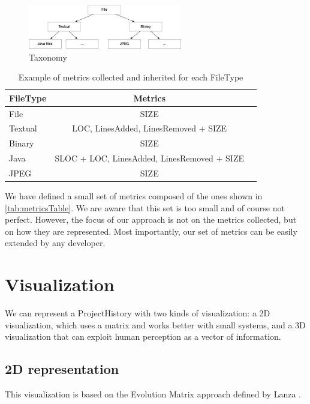 \begin{figure}
    \center
    \includegraphics[width=0.6\textwidth]{Taxonomy.jpg}
    \caption{Taxonomy}
    \label{fig:taxonomy}
\end{figure}

\begin{table}[ht]
    \centering
    \begin{tabular}{lcr} \hline
        {\bf FileType} & {\bf Metrics}\\ \hline
        File    & SIZE      \\
        Textual & LOC, LinesAdded, LinesRemoved + SIZE \\
        Binary  & SIZE         \\
        Java    & SLOC + LOC, LinesAdded, LinesRemoved + SIZE \\
        JPEG    & SIZE \\
    \end{tabular}
    \label{tab:metricsTable}
    \caption[]{Example of metrics collected and inherited for each FileType}
\end{table}

We have defined a small set of metrics composed of the ones shown in \autoref{tab:metricsTable}. We are aware that this set is too small and of course not perfect. However, the focus of our approach is not on the metrics collected, but on how they are represented. Most importantly, our set of metrics can be easily extended by any developer.


\section{Visualization}
We can represent a ProjectHistory with two kinds of visualization: a 2D visualization, which uses a matrix and works better with small systems, and a 3D visualization that can exploit human perception as a vector of information. 


\subsection{2D representation}
This visualization is based on the Evolution Matrix approach defined by Lanza \cite{Lanza2001}. 

